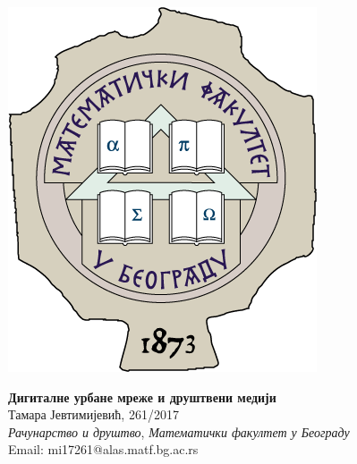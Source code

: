 \documentclass{article}
\title{}
\author{}
\date{}
\begin{document}

\begin{center}
  \begin{minipage}{.16\linewidth}
  \qquad\qquad
    \includegraphics[width=.7\linewidth]{media/images/grb.png}
    ~\vfill
    ~\vfill
  \end{minipage}
  \begin{minipage}{.6\linewidth}
    \begin{center}
       \textsf{\textbf{{\fontsize{90}{108}\selectfont Дигиталне урбане мреже и друштвени медији}}}\\\vspace{1cm}
       \textrm{\fontsize{40}{48}\selectfont Тамара Јевтимијевић, 261/2017 \\\vspace{5mm} \textit{Рачунарство и друштво}, \textit{Математички факултет у Београду}\\\vspace{10mm} Email: mi17261@alas.matf.bg.ac.rs}  
    \end{center}
  \end{minipage}
  \hspace{.03\linewidth}
    \begin{minipage}{.16\linewidth}
  \qquad\qquad

\end{minipage}
\end{center}
\end{document}
